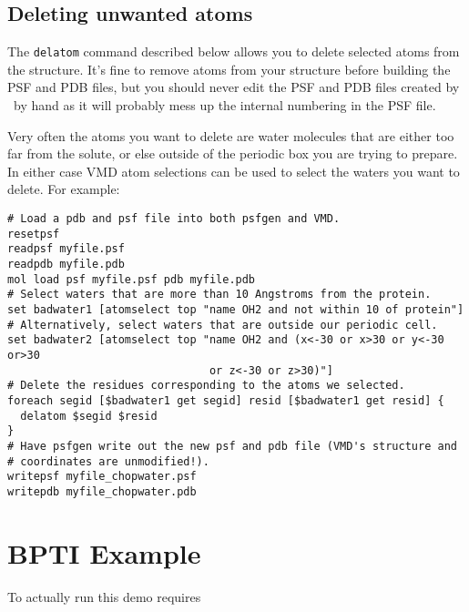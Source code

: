 \subsection{Deleting unwanted atoms}
The {\tt delatom} command described below allows you to delete selected
atoms from the structure.  It's fine to remove atoms from your structure
before building the PSF and PDB files, but you should never edit the PSF
and PDB files created by \PSFGEN\ by hand as it will probably mess up the
internal numbering in the PSF file.  

Very often the atoms you want to delete are water molecules that are
either too far from the solute, or else outside of the periodic box you
are trying to prepare.  In either case VMD atom selections can be used
to select the waters you want to delete.  For example:

\begin{verbatim}
# Load a pdb and psf file into both psfgen and VMD.
resetpsf
readpsf myfile.psf
readpdb myfile.pdb
mol load psf myfile.psf pdb myfile.pdb
# Select waters that are more than 10 Angstroms from the protein.
set badwater1 [atomselect top "name OH2 and not within 10 of protein"]
# Alternatively, select waters that are outside our periodic cell.
set badwater2 [atomselect top "name OH2 and (x<-30 or x>30 or y<-30 or>30
                               or z<-30 or z>30)"]
# Delete the residues corresponding to the atoms we selected.
foreach segid [$badwater1 get segid] resid [$badwater1 get resid] {
  delatom $segid $resid
}
# Have psfgen write out the new psf and pdb file (VMD's structure and
# coordinates are unmodified!).
writepsf myfile_chopwater.psf
writepdb myfile_chopwater.pdb
\end{verbatim}


\section{BPTI Example}

To actually run this demo requires

